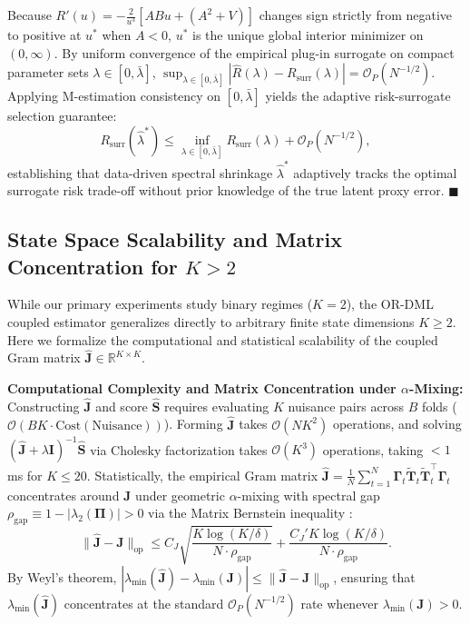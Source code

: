 \documentclass[twoside]{article}
\theoremstyle{definition}
\newcommand{\R}{\mathbb{R}}
\begin{document}
Because $R'(u) = -\frac{2}{u^3}[AB u + (A^2+V)]$ changes sign strictly from negative to positive at $u^*$ when $A < 0$, $u^*$ is the unique global interior minimizer on $(0, \infty)$. By uniform convergence of the empirical plug-in surrogate on compact parameter sets $\lambda \in [0, \bar{\lambda}]$, $\sup_{\lambda \in [0, \bar{\lambda}]} |\hat{R}(\lambda) - R_{\mathrm{surr}}(\lambda)| = \mathcal{O}_P(N^{-1/2})$. Applying M-estimation consistency on $[0, \bar{\lambda}]$ yields the adaptive risk-surrogate selection guarantee:
\begin{equation}
    R_{\mathrm{surr}}(\hat{\lambda}^*) \le \inf_{\lambda \in [0, \bar{\lambda}]} R_{\mathrm{surr}}(\lambda) + \mathcal{O}_P(N^{-1/2}),
\end{equation}
establishing that data-driven spectral shrinkage $\hat{\lambda}^*$ adaptively tracks the optimal surrogate risk trade-off without prior knowledge of the true latent proxy error. $\blacksquare$

\subsection{State Space Scalability and Matrix Concentration for $K > 2$}
\label{app:state_space_scalability}
While our primary experiments study binary regimes ($K=2$), the OR-DML coupled estimator generalizes directly to arbitrary finite state dimensions $K \ge 2$. Here we formalize the computational and statistical scalability of the coupled Gram matrix $\hat{\boldsymbol{J}} \in \R^{K \times K}$.

\textbf{Computational Complexity and Matrix Concentration under $\alpha$-Mixing:}
Constructing $\hat{\boldsymbol{J}}$ and score $\hat{\boldsymbol{S}}$ requires evaluating $K$ nuisance pairs across $B$ folds ($\mathcal{O}(B K \cdot \mathrm{Cost}(\text{Nuisance}))$). Forming $\hat{\boldsymbol{J}}$ takes $\mathcal{O}(N K^2)$ operations, and solving $(\hat{\boldsymbol{J}} + \lambda \boldsymbol{I})^{-1}\hat{\boldsymbol{S}}$ via Cholesky factorization takes $\mathcal{O}(K^3)$ operations, taking $<1$ ms for $K \le 20$.
Statistically, the empirical Gram matrix $\hat{\boldsymbol{J}} = \frac{1}{N}\sum_{t=1}^N \boldsymbol{\Gamma}_t \tilde{\boldsymbol{T}}_t \tilde{\boldsymbol{T}}_t^\top \boldsymbol{\Gamma}_t$ concentrates around $\boldsymbol{J}$ under geometric $\alpha$-mixing with spectral gap $\rho_{\mathrm{gap}} \equiv 1 - |\lambda_2(\boldsymbol{\Pi})| > 0$ via the Matrix Bernstein inequality \citep{banna2016bernstein}:
\begin{equation}
    \|\hat{\boldsymbol{J}} - \boldsymbol{J}\|_{\mathrm{op}} \le C_J \sqrt{\frac{K \log(K/\delta)}{N \cdot \rho_{\mathrm{gap}}}} + \frac{C_J' K \log(K/\delta)}{N \cdot \rho_{\mathrm{gap}}}.
\end{equation}
By Weyl's theorem, $|\lambda_{\min}(\hat{\boldsymbol{J}}) - \lambda_{\min}(\boldsymbol{J})| \le \|\hat{\boldsymbol{J}} - \boldsymbol{J}\|_{\mathrm{op}}$, ensuring that $\lambda_{\min}(\hat{\boldsymbol{J}})$ concentrates at the standard $\mathcal{O}_P(N^{-1/2})$ rate whenever $\lambda_{\min}(\boldsymbol{J}) > 0$.
\end{document}
